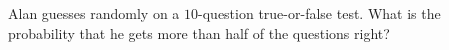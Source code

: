Alan guesses randomly on a $10$-question true-or-false test. What is the probability that he gets more than half of the questions right?
